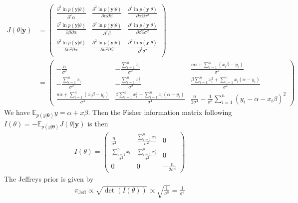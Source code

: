 \begin{align*}
    J(\theta \vert \bm{y}) 
    &=\begin{pmatrix}
        \frac{\partial^2 \ln p(\bm{y} \vert \theta)}{\partial^2 \alpha} &
        \frac{\partial^2 \ln p(\bm{y} \vert \theta)}{\partial \alpha \partial \beta} &
        \frac{\partial^2 \ln p(\bm{y} \vert \theta)}{\partial \alpha \partial \sigma^2} \\
        \frac{\partial^2 \ln p(\bm{y} \vert \theta)}{\partial \beta \partial \alpha} &
        \frac{\partial^2 \ln p(\bm{y} \vert \theta)}{\partial^2 \beta} &
        \frac{\partial^2 \ln p(\bm{y} \vert \theta)}{\partial \beta \partial \sigma^2} \\
        \frac{\partial^2 \ln p(\bm{y} \vert \theta)}{\partial \sigma^2 \partial \alpha} &
        \frac{\partial^2 \ln p(\bm{y} \vert \theta)}{\partial \sigma^2 \partial \beta} &
        \frac{\partial^2 \ln p(\bm{y} \vert \theta)}{\partial^2 \sigma^2} \\
    \end{pmatrix}\\
    &=
    \begin{pmatrix}
        -\frac{n}{\sigma^2} & -\frac{\sum_{i=1}^n x_i}{\sigma^2} & \frac{n\alpha + \sum_{i=1}^n (x_i\beta - y_i)}{\sigma^4}\\
        -\frac{\sum_{i=1}^n x_i}{\sigma^2} & -\frac{\sum_{i=1}^n x_i^2}{\sigma^2} & \frac{\beta\sum_{i=1}^n x_i^2 + \sum_{i=1}^n x_i(\alpha - y_i)} {\sigma^4}\\
        \frac{n\alpha + \sum_{i=1}^n (x_i\beta - y_i)}{\sigma^4} & \frac{\beta\sum_{i=1}^n x_i^2 + \sum_{i=1}^n x_i(\alpha - y_i)} {\sigma^4} &
        \frac{n}{2\sigma^4} - \frac{1}{\sigma^6} \sum_{i=1}^n (y_i - \alpha - x_i\beta)^2
    \end{pmatrix}
\end{align*}
We have $\mathbb{E}_{p(y \vert \bm{\theta})} y = \alpha + x\beta$. Then the Fisher information matrix following $I(\theta) = 
-\mathbb{E}_{p(y \vert \bm{\theta})} J(\theta \vert \bm{y}) $ is then
\begin{align*}
    I(\theta) = 
        \begin{pmatrix}
        \frac{n}{\sigma^2} & \frac{\sum_{i=1}^n x_i}{\sigma^2} & 0\\
        \frac{\sum_{i=1}^n x_i}{\sigma^2} & \frac{\sum_{i=1}^n x_i^2}{\sigma^2} & 0 \\
        0 & 0 & -\frac{n}{2\sigma^4}
    \end{pmatrix}
\end{align*}
The Jeffreys prior is given by 
\begin{align*}
    \pi_{\mathrm{Jeff}} \propto \sqrt{\det (I(\theta))} \propto \sqrt{ \frac{1}{\sigma^8} }= \frac{1}{\sigma^4}
\end{align*}

